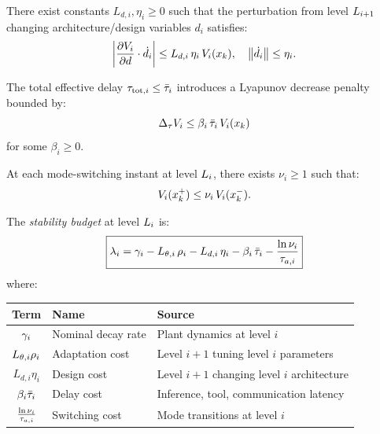 \documentclass[11pt,a4paper]{article}
\begin{document}
\begin{assumption}
\label{ass:design}
There exist constants $L_{d,i}, \eta_i \geq 0$ such that the perturbation from
level $L_{i+1}$ changing architecture/design variables $d_i$ satisfies:
\begin{equation}
  \left| \frac{\partial V_{i}}{\partial d} \cdot \dot{d}_i \right|
  \leq L_{d,i} \, \eta_i \, V_{i}(x_k),
  \quad
  \left\| \dot{d}_i \right\| \leq \eta_i.
\end{equation}
\end{assumption}

\begin{assumption}
\label{ass:delay}
The total effective delay $\tau_{\text{tot},i} \leq \bar{\tau}_i$ introduces a
Lyapunov decrease penalty bounded by:
\begin{equation}
  \Delta_\tau V_{i} \leq \beta_i \, \bar{\tau}_i \, V_{i}(x_k)
\end{equation}
for some $\beta_i \geq 0$.
\end{assumption}

\begin{assumption}
\label{ass:jump}
At each mode-switching instant at level $L_{i}$, there exists $\nu_i \geq 1$
such that:
\begin{equation}
  V_{i}(x_k^+) \leq \nu_i \, V_{i}(x_k^-).
\end{equation}
\end{assumption}

\begin{definition}
\label{def:budget}
The \emph{stability budget} at level $L_{i}$ is:
\begin{equation}
  \boxed{
  \stab_i
  = \decay_i
  - L_{\param,i} \, \rho_i
  - L_{d,i} \, \eta_i
  - \beta_i \, \taubar_i
  - \frac{\ln \nu_i}{\taua[i]}
  }
  \label{eq:budget}
\end{equation}
where:
\begin{center}
\begin{tabular}{@{}cll@{}}
  \toprule
  \textbf{Term} & \textbf{Name} & \textbf{Source} \\
  \midrule
  $\gamma_i$ & Nominal decay rate & Plant dynamics at level $i$ \\
  $L_{\theta,i} \rho_i$ & Adaptation cost & Level $i{+}1$ tuning level $i$ parameters \\
  $L_{d,i} \eta_i$ & Design cost & Level $i{+}1$ changing level $i$ architecture \\
  $\beta_i \bar{\tau}_i$ & Delay cost & Inference, tool, communication latency \\
  $\frac{\ln \nu_i}{\taua[i]}$ & Switching cost & Mode transitions at level $i$ \\
  \bottomrule
\end{tabular}
\end{center}
\end{definition}
\end{document}
